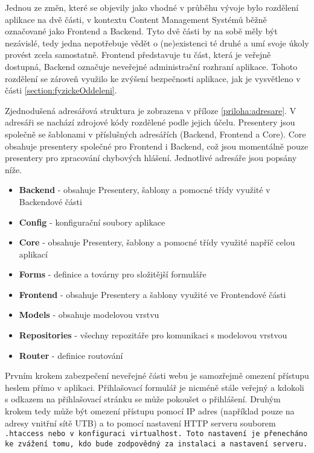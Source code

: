 Jednou ze změn, které se objevily jako vhodné v průběhu vývoje bylo rozdělení aplikace na dvě části, v kontextu Content Management Systémů běžně označované jako Frontend a Backend. Tyto dvě části by na sobě měly být nezávislé, tedy jedna nepotřebuje vědět o (ne)existenci té druhé a umí svoje úkoly provést zcela samostatně. Frontend představuje tu část, která je veřejně dostupná, Backend označuje neveřejné administrační rozhraní aplikace. Tohoto rozdělení se zároveň využilo ke zvýšení bezpečnosti aplikace, jak je vysvětleno v části \ref{section:fyzickeOddeleni}.

Zjednodušená adresářová struktura je zobrazena v příloze \ref{priloha:adresare}. V adresáři  se nachází zdrojové kódy rozdělené podle jejich účelu. Presentery jsou společně se šablonami v příslušných adresářích (Backend, Frontend a Core). Core obsahuje presentery společné pro Frontend i Backend, což jsou momentálně pouze presentery pro zpracování chybových hlášení. Jednotlivé adresáře jsou popsány níže.
\begin{itemize}
	\item  \textbf{Backend} - obsahuje Presentery, šablony a pomocné třídy využité v Backendové části
	\item \textbf{Config} - konfigurační soubory aplikace
	\item \textbf{Core} - obsahuje Presentery, šablony a pomocné třídy využité napříč celou aplikací
	\item \textbf{Forms} - definice a továrny pro složitější formuláře
	\item \textbf{Frontend} - obsahuje Presentery a šablony využité ve Frontendové části
	\item \textbf{Models} - obsahuje modelovou vrstvu
	\item \textbf{Repositories} - všechny repozitáře pro komunikaci s modelovou vrstvou
	\item \textbf{Router} - definice routování
\end{itemize}

 \label{section:fyzickeOddeleni}
Prvním krokem zabezpečení neveřejné části webu je samozřejmě omezení přístupu heslem přímo v aplikaci. Přihlašovací formulář je nicméně stále veřejný a kdokoli s odkazem na přihlašovací stránku se může pokoušet o přihlášení. Druhým krokem tedy může být omezení přístupu pomocí IP adres (například pouze na adresy vnitřní sítě UTB) a to pomocí nastavení HTTP serveru souborem \tt{.htaccess} nebo v konfiguraci \tt{virtualhost}. Toto nastavení je přenecháno ke zvážení tomu, kdo bude zodpovědný za instalaci a nastavení serveru.

